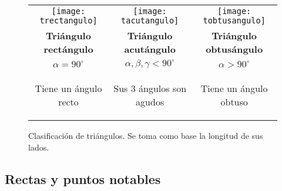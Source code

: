 \begin{figure*}[h!]
\def\arraystretch{1.5}%
\caption[Clasificación de t]{Clasificación de triángulos. 
	Se toma como base la longitud de sus lados.
}
\label{clasiftriang}
\begin{tabular}{c  c  c }
	\texttt{[image: trectangulo]} & 
	\texttt{[image: tacutangulo]}  & 
	\texttt{[image: tobtusangulo]} 
	\\ %

	\textbf{Triángulo rectángulo} & 
	\textbf{Triángulo acutángulo} & 
	\textbf{Triángulo obtusángulo}                       
	\\ %

	$\alpha = 90^\circ$ &
	$\alpha, \beta, \gamma < 90^\circ$ &
	$\alpha > 90^\circ$ 
	\\

	\parbox{4cm}{
		\begin{center}
			Tiene un ángulo recto
		\end{center} 
	} & 
	\parbox{4cm}{
		\begin{center}
			Sus 3 ángulos son agudos
		\end{center} 
	} & 
	\parbox{4cm}{
		\begin{center}
			Tiene un ángulo obtuso
		\end{center} 
	}                                 
\end{tabular}
\end{figure*}

\newpage
\subsection{Rectas y puntos notables}


